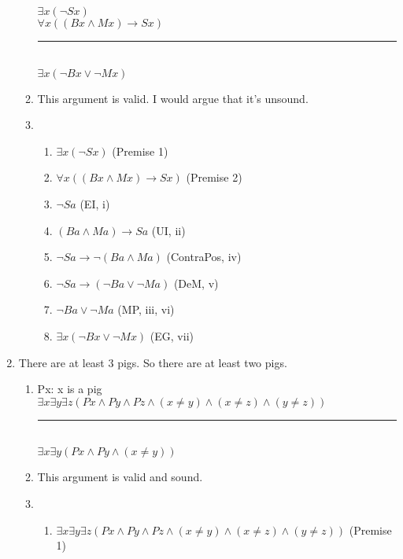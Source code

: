 \documentclass{article}
\begin{document}
\begin{enumerate}
\begin{enumerate}
                        $\exists x(\neg Sx)$\\
                        $\forall x((Bx \land Mx) \to Sx)$\\
                        \rule{15em}{.5pt}\\
                        $\exists x(\neg Bx \lor \neg Mx)$
                  \item This argument is valid. I would argue that it's unsound.
                        \setcounter{enumii}{3}
                  \item \begin{enumerate}
                              \item $\exists x(\neg Sx)$ (Premise 1)
                              \item $\forall x((Bx \land Mx) \to Sx)$ (Premise 2)
                              \item $\neg Sa$ (EI, i)
                              \item $(Ba \land Ma) \to Sa$ (UI, ii)
                              \item $\neg Sa \to \neg (Ba \land Ma)$ (ContraPos, iv)
                              \item $\neg Sa \to (\neg Ba \lor \neg Ma)$ (DeM, v)
                              \item $\neg Ba \lor \neg Ma$ (MP, iii, vi)
                              \item $\exists x(\neg Bx \lor \neg Mx)$ (EG, vii)
                        \end{enumerate}
            \end{enumerate}
      \item There are at least 3 pigs. So there are at least two pigs.
            \begin{enumerate}
                  \item Px: x is a pig\\
                        $\exists x \exists y \exists z (Px \land Py \land Pz \land (x \neq y) \land (x \neq z) \land (y \neq z))$\\
                        \rule{15em}{.5pt}\\
                        $\exists x \exists y (Px \land Py \land (x \neq y))$
                  \item This argument is valid and sound.
                        \setcounter{enumii}{3}
                  \item \begin{enumerate}
                              \item $\exists x \exists y \exists z (Px \land Py \land Pz \land (x \neq y) \land (x \neq z) \land (y \neq z))$ (Premise 1)

\end{enumerate}
\end{enumerate}
\end{enumerate}
\end{document}
